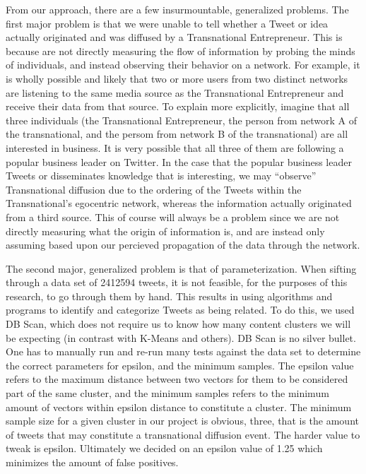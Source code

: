 From our approach, there are a few insurmountable, generalized
problems. The first major problem is that we were unable to tell
whether a Tweet or idea actually originated and was diffused by a
Transnational Entrepreneur. This is because are not directly measuring
the flow of information by probing the minds of individuals, and
instead observing their behavior on a network. For example, it is
wholly possible and likely that two or more users from two distinct
networks are listening to the same media source as the Transnational
Entrepreneur and receive their data from that source. To explain more
explicitly, imagine that all three individuals (the Transnational
Entrepreneur, the person from network A of the transnational, and the
persom from network B of the transnational) are all interested in
business. It is very possible that all three of them are following a
popular business leader on Twitter. In the case that the popular
business leader Tweets or disseminates knowledge that is interesting,
we may ``observe'' Transnational diffusion due to the ordering of the
Tweets within the Transnational's egocentric network, whereas the
information actually originated from a third source. This of course
will always be a problem since we are not directly measuring what the
origin of information is, and are instead only assuming based upon our
percieved propagation of the data through the network.

The second major, generalized problem is that of parameterization.
When sifting through a data set of 2412594 tweets, it is not feasible,
for the purposes of this research, to go through them by hand. This
results in using algorithms and programs to identify and categorize
Tweets as being related. To do this, we used DB Scan, which does not
require us to know how many content clusters we will be expecting (in
contrast with K-Means and others). DB Scan is no silver bullet. One
has to manually run and re-run many tests against the data set to
determine the correct parameters for epsilon, and the minimum
samples. The epsilon value refers to the maximum distance between two
vectors for them to be considered part of the same cluster, and the
minimum samples refers to the minimum amount of vectors within epsilon
distance to constitute a cluster. The minimum sample size for a given
cluster in our project is obvious, three, that is the amount of tweets
that may constitute a transnational diffusion event. The harder value
to tweak is epsilon. Ultimately we decided on an epsilon value of 1.25
which minimizes the amount of false positives.

